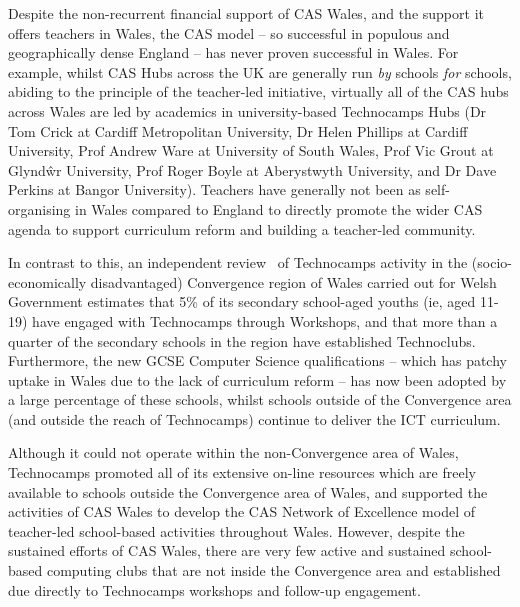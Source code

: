\documentclass{sig-alternate}
\begin{document}

Despite the non-recurrent financial support of CAS Wales, and the
support it offers teachers in Wales, the CAS model -- so successful in
populous and geographically dense England -- has never proven
successful in Wales.  For example, whilst CAS Hubs across the UK are
generally run \emph{by} schools \emph{for} schools, abiding to the
principle of the teacher-led initiative, virtually all of the CAS hubs
across Wales are led by academics in university-based Technocamps Hubs
(Dr Tom Crick at Cardiff Metropolitan University, Dr Helen Phillips at
Cardiff University, Prof Andrew Ware at University of South Wales,
Prof Vic Grout at Glynd\^{w}r University, Prof Roger Boyle at
Aberystwyth University, and Dr Dave Perkins at Bangor University).
Teachers have generally not been as self-organising in Wales compared
to England to directly promote the wider CAS agenda to support
curriculum reform and building a teacher-led community.

In contrast to this, an independent review~\cite{Wavehill:2015} of
Technocamps activity in the (socio-economically disadvantaged)
Convergence region of Wales carried out for Welsh Government estimates
that 5\% of its secondary school-aged youths (ie, aged 11-19) have
engaged with Technocamps through Workshops, and that more than a
quarter of the secondary schools in the region have established
Technoclubs.  Furthermore, the new GCSE Computer Science
qualifications -- which has patchy uptake in Wales due to the lack of
curriculum reform -- has now been adopted by a large percentage of
these schools, whilst schools outside of the Convergence area (and
outside the reach of Technocamps) continue to deliver the ICT
curriculum.

Although it could not operate within the non-Convergence area of
Wales, Technocamps promoted all of its extensive on-line resources
which are freely available to schools outside the Convergence area of
Wales, and supported the activities of CAS Wales to develop the CAS
Network of Excellence model of teacher-led school-based activities
throughout Wales. However, despite the sustained efforts of CAS
Wales, there are very few active and sustained school-based computing
clubs that are not inside the Convergence area and established due
directly to Technocamps workshops and follow-up engagement.
\end{document}
